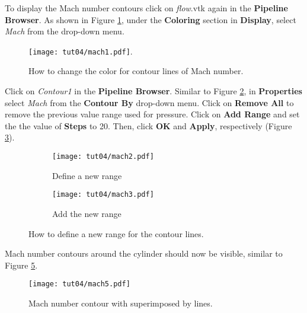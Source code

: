 To display the Mach number contours click on \textit{flow}.vtk again in the \textbf{Pipeline Browser}. As shown in Figure \ref{fig4:mach1_4}, under the \textbf{Coloring} section in \textbf{Display}, select \textit{Mach} from the drop-down menu.
\begin{figure}[htbp]
    \centering
    \texttt{[image: tut04/mach1.pdf]}.
    \caption{How to change the color for contour lines of Mach number.}
    \label{fig4:mach1_4}
\end{figure}
Click on \textit{Contour1} in the \textbf{Pipeline Browser}. Similar to Figure \ref{fig4:mach2_4 a}, in \textbf{Properties} select \textit{Mach} from the \textbf{Contour By} drop-down menu. Click on \textbf{Remove All} to remove the previous value range used for pressure. Click on \textbf{Add Range} and set the the value of \textbf{Steps} to 20. Then, click \textbf{OK} and \textbf{Apply}, respectively (Figure \ref{fig4:mach2_4 b}).
\begin{figure}[htbp]
    \centering
    \begin{subfigure}[b]{0.4\textwidth}
        \centering
        \texttt{[image: tut04/mach2.pdf]}
        \caption{Define a new range}
        \label{fig4:mach2_4 a}
    \end{subfigure}
    \hfill
    \begin{subfigure}[b]{.4\textwidth}
        \centering
        \texttt{[image: tut04/mach3.pdf]}
        \caption{Add the new range}
        \label{fig4:mach2_4 b}
    \end{subfigure}     
    \caption{How to define a new range for the contour lines.}
    \label{fig4:mach2_4}
\end{figure}
Mach number contours around the cylinder should now be visible, similar to Figure \ref{fig4:mach5_4}.
\begin{figure}[htbp]
    \centering
    \texttt{[image: tut04/mach5.pdf]}
    \caption{Mach number contour with superimposed by lines.}
    \label{fig4:mach5_4}
\end{figure}
